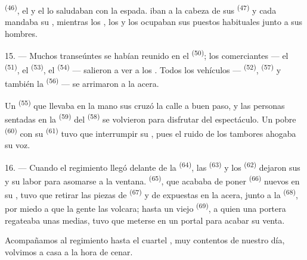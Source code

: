  \textsuperscript{(46)}, el  y
el  lo saludaban con la espada.
 iban a la cabeza de sus 
\textsuperscript{(47)} y cada  mandaba su , mientras
los , los  y los
 ocupaban sus puestos habituales junto a sus hombres.

15. --- Muchos transeúntes se habían reunido en el 
\textsuperscript{(50)}; los comerciantes --- el  \textsuperscript{(51)}, el
 \textsuperscript{(53)}, el  \textsuperscript{(54)} --- salieron
a ver a los . Todos los vehículos ---  \textsuperscript{(52)},  \textsuperscript{(57)} y también
la  \textsuperscript{(56)} --- se arrimaron a la acera.

\VUsaut{3.0mm}

Un  \textsuperscript{(55)} que llevaba en la mano sus
 cruzó la calle a buen paso, y las personas
sentadas en la  \textsuperscript{(59)} del 
\textsuperscript{(58)} se volvieron para disfrutar del espectáculo. Un pobre
 \textsuperscript{(60)} con su 
\textsuperscript{(61)} tuvo que interrumpir su , pues el ruido de los
tambores ahogaba su voz.

16. --- Cuando el regimiento llegó delante de la 
\textsuperscript{(64)}, las  \textsuperscript{(63)} y los 
\textsuperscript{(62)} dejaron sus  y su labor para
asomarse a la ventana.  \textsuperscript{(65)}, que acababa de
poner  \textsuperscript{(66)} nuevos en su , tuvo que
retirar las piezas de  \textsuperscript{(67)} y de 
expuestas en la acera, junto a la 
\textsuperscript{(68)}, por miedo a que la gente las volcara; hasta un viejo
 \textsuperscript{(69)}, a quien una portera regateaba unas medias,
tuvo que meterse en un portal para acabar su venta.

Acompañamos al regimiento hasta el cuartel , muy contentos de
nuestro día, volvimos a casa a la hora de cenar.

